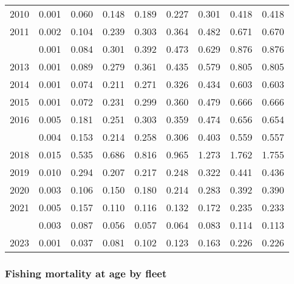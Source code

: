 \documentclass[
]{article}
\begin{document}
\begin{longtable}[t]{lrrrrrrrr}
2010 & 0.001 & 0.060 & 0.148 & 0.189 & 0.227 & 0.301 & 0.418 & 0.418\\
2011 & 0.002 & 0.104 & 0.239 & 0.303 & 0.364 & 0.482 & 0.671 & 0.670\\
\addlinespace
2012 & 0.001 & 0.084 & 0.301 & 0.392 & 0.473 & 0.629 & 0.876 & 0.876\\
2013 & 0.001 & 0.089 & 0.279 & 0.361 & 0.435 & 0.579 & 0.805 & 0.805\\
2014 & 0.001 & 0.074 & 0.211 & 0.271 & 0.326 & 0.434 & 0.603 & 0.603\\
2015 & 0.001 & 0.072 & 0.231 & 0.299 & 0.360 & 0.479 & 0.666 & 0.666\\
2016 & 0.005 & 0.181 & 0.251 & 0.303 & 0.359 & 0.474 & 0.656 & 0.654\\
\addlinespace
2017 & 0.004 & 0.153 & 0.214 & 0.258 & 0.306 & 0.403 & 0.559 & 0.557\\
2018 & 0.015 & 0.535 & 0.686 & 0.816 & 0.965 & 1.273 & 1.762 & 1.755\\
2019 & 0.010 & 0.294 & 0.207 & 0.217 & 0.248 & 0.322 & 0.441 & 0.436\\
2020 & 0.003 & 0.106 & 0.150 & 0.180 & 0.214 & 0.283 & 0.392 & 0.390\\
2021 & 0.005 & 0.157 & 0.110 & 0.116 & 0.132 & 0.172 & 0.235 & 0.233\\
\addlinespace
2022 & 0.003 & 0.087 & 0.056 & 0.057 & 0.064 & 0.083 & 0.114 & 0.113\\
2023 & 0.001 & 0.037 & 0.081 & 0.102 & 0.123 & 0.163 & 0.226 & 0.226\\*
\end{longtable}

\subsubsection{Fishing mortality at age by
fleet}\label{fishing-mortality-at-age-by-fleet}
\end{document}
